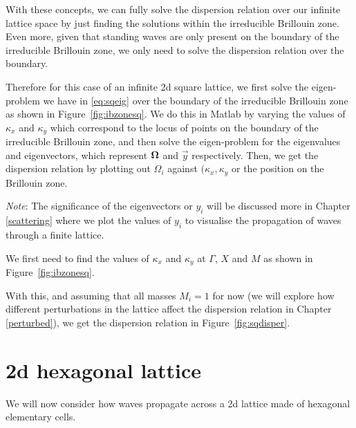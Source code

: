 With these concepts, we can fully solve the dispersion relation over our
infinite lattice space by just finding the solutions within the irreducible
Brillouin zone. Even more, given that standing waves are only present on the
boundary of the irreducible Brillouin zone, we only need to solve the
dispersion relation over the boundary.

Therefore for this case of an infinite 2d square lattice, we first solve the
eigen-problem we have in \eqref{eq:sqeig} over the boundary of the irreducible
Brillouin zone as shown in Figure~\ref{fig:ibzonesq}. We do this in Matlab by
varying the values of $\kappa_{x}$ and $\kappa_{y}$ which correspond to the
locus of points on the boundary of the irreducible Brillouin zone, and then
solve the eigen-problem for the eigenvalues and eigenvectors, which represent
$\mathbf{\Omega}$ and $\vec{y}$ respectively. Then, we get the dispersion relation
by plotting out $\Omega_i$ against $(\kappa_x,\kappa_y$ or the position on the
Brillouin zone.

\textit{Note}: The significance of the
eigenvectors or $y_i$ will be discussed
more in Chapter \ref{scattering} where we
plot the values of $y_i$ to visualise the
propagation of waves through a finite
lattice.

We first need to find the values of $\kappa_{x}$ and $\kappa_{y}$ at $\Gamma$,
$X$ and $M$ as shown in Figure~\ref{fig:ibzonesq}.

With this, and assuming that all masses $M_i=1$ for now (we will explore how
different perturbations in the lattice affect the dispersion relation in
Chapter \ref{perturbed}), we get the dispersion relation in
Figure~\ref{fig:sqdisper}. 

\section{2d hexagonal lattice}
\label{2dhexdisper}
We will now consider how waves propagate across a 2d lattice made of hexagonal
elementary cells. 

